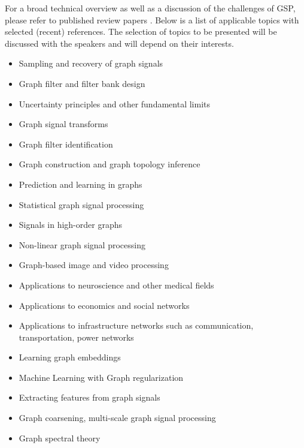 \documentclass[a4paper]{scrartcl}
\begin{document}
For a broad technical overview as well as a discussion of the challenges of GSP,
please refer to published review papers \cite{shuman_emerging_2013,
sandryhaila_discrete_2014, coifman_diffusion_2006, ekambaram_circulant_2013}.
Below is a list of applicable topics with selected (recent) references. The
selection of topics to be presented will be discussed with the speakers and will
depend on their interests.
\begin{itemize}
	\setlength{\itemsep}{0pt} \setlength{\parskip}{0pt}
	\item Sampling and recovery of graph signals \cite{puy2015random,tsitsvero2015signals,anis2014towards}
	\item Graph filter and filter bank design \cite{hammond2011wavelets,narang_bior_filters,ekambaram_globalsip,leonardi_multislice,leonardi_fmri,shuman2013spectrum}
	\item Uncertainty principles and other fundamental limits \cite{perraudin2016global,agaskar_spie,pasdeloup}
	\item Graph signal transforms \cite{szlam,gavish,Maggioni_biorthogonal,coifman_diffusion_2006,lafon_coarse,narang_lifting_graphs}
	\item Graph filter identification \cite{thanou_TSP_2014}
	\item Graph construction and graph topology inference \cite{kalofolias2016learn,Dong:2014tj}
	\item Prediction and learning in graphs
	\item Statistical graph signal processing \cite{perraudin2016stationary,zhang2015graph,gadde2015probabilistic}
	\item Signals in high-order graphs
	\item Non-linear graph signal processing
	\item Graph-based image and video processing \cite{elmoataz2008nonlocal,lezoray2008nonlocal,shahid2015fast}
	\item Applications to neuroscience and other medical fields \cite{huang2015graph,hu2015spectral}
	\item Applications to economics and social networks
	\item Applications to infrastructure networks such as communication, transportation, power networks \cite{mcgraw,jain2014big,borgnat2011shared}
	\item Learning graph embeddings \cite{von2008consistency,zhou2006learning,belkin2003laplacian}
	\item Machine Learning with Graph regularization \cite{smola,belkin2005towards,zhou2004regularization,zhou2005learning,belkin2006manifold}
	\item Extracting features from graph signals
	\item Graph coarsening, multi-scale graph signal processing \cite{spielman2011graph,shuman2016multiscale,liu_coarsening,lafon_coarse,jansen}
	\item Graph spectral theory \cite{chung1997spectral,belkin2007convergence,shuman2015vertex,sandryhaila2014discrete,Nakatsukasa2013mysteries,brooks,dekel}
\end{itemize}
\end{document}
